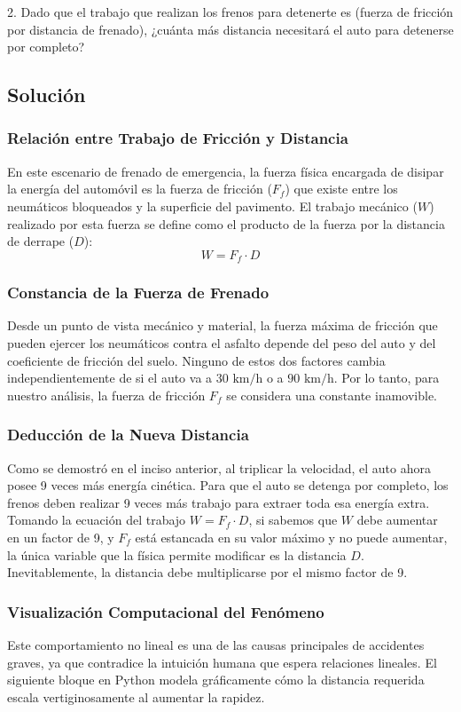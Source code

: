 \documentclass[a4paper,12pt]{article}
\begin{document}
2. Dado que el trabajo que realizan los frenos para detenerte es (fuerza de fricción por distancia de frenado), ¿cuánta más distancia necesitará el auto para detenerse por completo?

\subsection*{Solución}

\subsubsection*{Relación entre Trabajo de Fricción y Distancia}
En este escenario de frenado de emergencia, la fuerza física encargada de disipar la energía del automóvil es la fuerza de fricción ($F_f$) que existe entre los neumáticos bloqueados y la superficie del pavimento. El trabajo mecánico ($W$) realizado por esta fuerza se define como el producto de la fuerza por la distancia de derrape ($D$):
$$W = F_f \cdot D$$

\subsubsection*{Constancia de la Fuerza de Frenado}
Desde un punto de vista mecánico y material, la fuerza máxima de fricción que pueden ejercer los neumáticos contra el asfalto depende del peso del auto y del coeficiente de fricción del suelo. Ninguno de estos dos factores cambia independientemente de si el auto va a $30\text{ km/h}$ o a $90\text{ km/h}$. Por lo tanto, para nuestro análisis, la fuerza de fricción $F_f$ se considera una constante inamovible.

\subsubsection*{Deducción de la Nueva Distancia}
Como se demostró en el inciso anterior, al triplicar la velocidad, el auto ahora posee 9 veces más energía cinética. Para que el auto se detenga por completo, los frenos deben realizar 9 veces más trabajo para extraer toda esa energía extra.
Tomando la ecuación del trabajo $W = F_f \cdot D$, si sabemos que $W$ debe aumentar en un factor de 9, y $F_f$ está estancada en su valor máximo y no puede aumentar, la única variable que la física permite modificar es la distancia $D$. Inevitablemente, la distancia debe multiplicarse por el mismo factor de 9.

\subsubsection*{Visualización Computacional del Fenómeno}
Este comportamiento no lineal es una de las causas principales de accidentes graves, ya que contradice la intuición humana que espera relaciones lineales. El siguiente bloque en Python modela gráficamente cómo la distancia requerida escala vertiginosamente al aumentar la rapidez.
\end{document}
